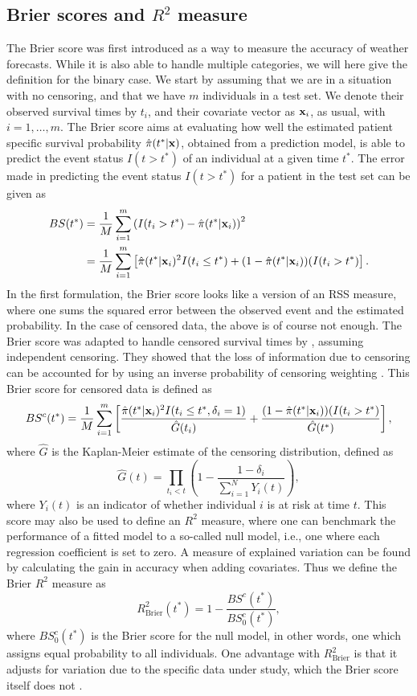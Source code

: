 \subsection{Brier scores and $R^2$ measure}
The Brier score \citep{brier1950} was first introduced as a way to measure the accuracy of weather forecasts. While it is also able to handle multiple categories, we will here give the definition for the binary case. We start by assuming that we are in a situation with no censoring, and that we have $m$ individuals in a test set. We denote their observed survival times by $t_i$, and their covariate vector as $\mathbf{x}_i$, as usual, with $i=1,\ldots,m$. The Brier score aims at evaluating how well the estimated patient specific survival probability $\hat{\pi}(t^*|\mathbf{x})$, obtained from a prediction model, is able to predict the event status $I(t>t^*)$ of an individual at a given time $t^*$. The error made in predicting the event status $I(t>t^*)$ for a patient in the test set can be given as
\begin{align*}
BS(t^*)&=\frac{1}{M}\sum_{i=1}^m\left(I(t_i>t^*)-\hat{\pi}(t^*|\mathbf{x}_i)\right)^2 \\
    &=\frac{1}{M}\sum_{i=1}^m\left[\hat{\pi}(t^*|\mathbf{x}_i)^2I(t_i\leq t^*)+(1-\hat{\pi}(t^*|\mathbf{x}_i))(I(t_i>t^*)\right].
\end{align*}
In the first formulation, the Brier score looks like a version of an RSS measure, where one sums the squared error between the observed event and the estimated probability. In the case of censored data, the above is of course not enough. The Brier score was adapted to handle censored survival times by \citet{graf}, assuming independent censoring. They showed that the loss of information due to censoring can be accounted for by using an inverse probability of censoring weighting \citep{bovelstadborgan}. This Brier score for censored data is defined as
\begin{equation*}
    BS^c(t^*)=\frac{1}{M}\sum_{i=1}^m\left[\frac{\hat{\pi}(t^*|\mathbf{x}_i)^2I(t_i\leq t^*,\delta_i=1)}{\hat{G}(t_i)}+\frac{(1-\hat{\pi}(t^*|\mathbf{x}_i))(I(t_i>t^*)}{\hat{G}(t^*)}\right],
\end{equation*}
where $\hat{G}$ is the Kaplan-Meier estimate of the censoring distribution, defined as
\begin{equation*}
    \hat{G}(t)=\prod_{t_i<t}\left(1-\frac{1-\delta_i}{\sum_{i=1}^NY_i(t)}\right),
\end{equation*}
where $Y_i(t)$ is an indicator of whether individual $i$ is at risk at time $t$. This score may also be used to define an $R^2$ measure, where one can benchmark the performance of a fitted model to a so-called null model, i.e., one where each regression coefficient is set to zero. A measure of explained variation can be found by calculating the gain in accuracy when adding covariates. Thus we define the Brier $R^2$ measure as
\begin{equation*}
    R^2_{\text{Brier}}(t^*)=1-\frac{BS^c(t^*)}{BS^c_0(t^*)},
\end{equation*}
where $BS^c_0(t^*)$ is the Brier score for the null model, in other words, one which assigns equal probability to all individuals. One advantage with $R^2_{\text{Brier}}$ is that it adjusts for variation due to the specific data under study, which the Brier score itself does not \citep{bovelstadborgan}.